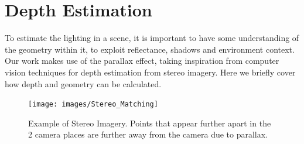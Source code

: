 \documentclass[ %
                    author={Gavin Parker},
                supervisor={Dr. Neill Campbell},
                    degree={MEng},
                     title={Deep Learning for Illumination Estimation from Stereo Images},
                  subtitle={},
                      type={Research},
                      year={2018} ]{dissertation}
\begin{document}
\section{Depth Estimation}
To estimate the lighting in a scene, it is important to have some understanding of the geometry within it, to exploit reflectance, shadows and environment context. Our work makes use of the parallax effect, taking inspiration from computer vision techniques for depth estimation from stereo imagery. Here we briefly cover how depth and geometry can be calculated.
\begin{figure}[H]
\centering
\texttt{[image: images/Stereo\_Matching]}
\caption{Example of Stereo Imagery. Points that appear further apart in the 2 camera places are further away from the camera due to parallax.}
\label{fig:stereo}
\end{figure}
\end{document}
